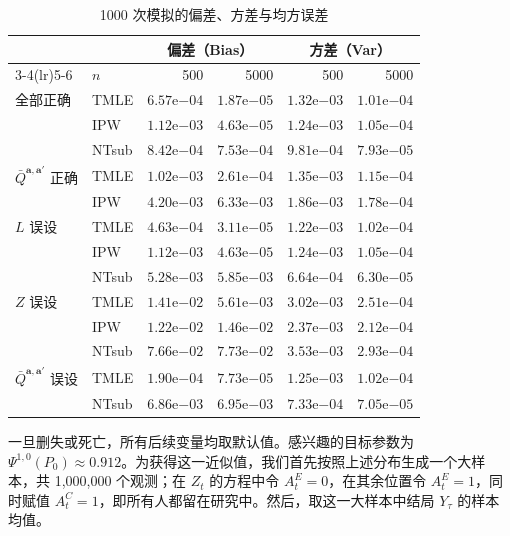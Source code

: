 \FloatBarrier
\begin{table}[htbp]
\centering
\small
\setlength{\tabcolsep}{4pt}
\caption{1000 次模拟的偏差、方差与均方误差}
\label{tab:ch17-simulation}
\begin{tabular}{llrrrr}
\toprule
 &&\multicolumn{2}{c}{偏差（Bias）}&\multicolumn{2}{c}{方差（Var）}\\
\cmidrule(lr){3-4}\cmidrule(lr){5-6}
 &$n$&500&5000&500&5000\\
\midrule
全部正确&TMLE&$6.57\mathrm{e}{-04}$&$1.87\mathrm{e}{-05}$&$1.32\mathrm{e}{-03}$&$1.01\mathrm{e}{-04}$\\
 &IPW&$1.12\mathrm{e}{-03}$&$4.63\mathrm{e}{-05}$&$1.24\mathrm{e}{-03}$&$1.05\mathrm{e}{-04}$\\
 &NTsub&$8.42\mathrm{e}{-04}$&$7.53\mathrm{e}{-04}$&$9.81\mathrm{e}{-04}$&$7.93\mathrm{e}{-05}$\\
\midrule
$\bar Q^{\mathbf a,\mathbf a'}$ 正确&TMLE&$1.02\mathrm{e}{-03}$&$2.61\mathrm{e}{-04}$&$1.35\mathrm{e}{-03}$&$1.15\mathrm{e}{-04}$\\
 &IPW&$4.20\mathrm{e}{-03}$&$6.33\mathrm{e}{-03}$&$1.86\mathrm{e}{-03}$&$1.78\mathrm{e}{-04}$\\
\midrule
$L$ 误设&TMLE&$4.63\mathrm{e}{-04}$&$3.11\mathrm{e}{-05}$&$1.22\mathrm{e}{-03}$&$1.02\mathrm{e}{-04}$\\
 &IPW&$1.12\mathrm{e}{-03}$&$4.63\mathrm{e}{-05}$&$1.24\mathrm{e}{-03}$&$1.05\mathrm{e}{-04}$\\
 &NTsub&$5.28\mathrm{e}{-03}$&$5.85\mathrm{e}{-03}$&$6.64\mathrm{e}{-04}$&$6.30\mathrm{e}{-05}$\\
\midrule
$Z$ 误设&TMLE&$1.41\mathrm{e}{-02}$&$5.61\mathrm{e}{-03}$&$3.02\mathrm{e}{-03}$&$2.51\mathrm{e}{-04}$\\
 &IPW&$1.22\mathrm{e}{-02}$&$1.46\mathrm{e}{-02}$&$2.37\mathrm{e}{-03}$&$2.12\mathrm{e}{-04}$\\
 &NTsub&$7.66\mathrm{e}{-02}$&$7.73\mathrm{e}{-02}$&$3.53\mathrm{e}{-03}$&$2.93\mathrm{e}{-04}$\\
\midrule
$\bar Q^{\mathbf a,\mathbf a'}$ 误设&TMLE&$1.90\mathrm{e}{-04}$&$7.73\mathrm{e}{-05}$&$1.25\mathrm{e}{-03}$&$1.02\mathrm{e}{-04}$\\
 &NTsub&$6.86\mathrm{e}{-03}$&$6.95\mathrm{e}{-03}$&$7.33\mathrm{e}{-04}$&$7.05\mathrm{e}{-05}$\\
\bottomrule
\end{tabular}
\end{table}
\FloatBarrier

一旦删失或死亡，所有后续变量均取默认值。感兴趣的目标参数为 $\Psi^{1,0}(P_0)\approx0.912$。为获得这一近似值，我们首先按照上述分布生成一个大样本，共 1,000,000 个观测；在 $Z_t$ 的方程中令 $A_t^E=0$，在其余位置令 $A_t^E=1$，同时赋值 $A_t^C=1$，即所有人都留在研究中。然后，取这一大样本中结局 $Y_\tau$ 的样本均值。

